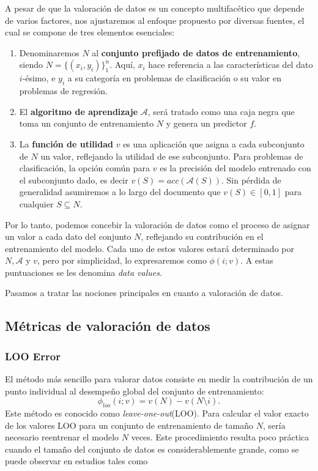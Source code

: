 A pesar de que la valoración de datos es un concepto
multifacético que depende de varios factores, nos
ajustaremos al enfoque propuesto por diversas
fuentes\cite{dataShapley,betaShapley}, el cual se compone
de tres elementos esenciales:

\begin{enumerate}
  \item  Denominaremos $N$ al \textbf{conjunto prefijado de datos
  de entrenamiento}, siendo $N = \{ (x_i, y_i) \}_1^n$.
  Aquí, $x_i$ hace referencia a las características del dato
  $i$-ésimo, e $y_i$ a su categoría en problemas de
  clasificación o su valor en problemas de regresión.
  
  \item El \textbf{algoritmo de aprendizaje}  $\mathcal{A}$,
  será tratado como una caja negra que toma un conjunto de
  entrenamiento $N$ y genera un predictor $f$.
  
  \item La \textbf{función de utilidad} $v$ es una aplicación
  que asigna a cada subconjunto de $N$ un valor, reflejando
  la utilidad de ese subconjunto. Para problemas de clasificación,
  la opción común para $v$ es la precisión del modelo
  entrenado con el subconjunto dado, es decir
  $v(S) = acc (\mathcal{A} (S))$. Sin pérdida de generalidad
  asumiremos a lo largo del documento que $v (S) \in [0, 1]$
  para cualquier $S \subseteq N$.
\end{enumerate}

Por lo tanto, podemos concebir la valoración de datos como el
proceso de asignar un valor a cada dato del conjunto $N$,
reflejando su contribución en el entrenamiento del modelo.
Cada uno de estos valores estará determinado por $N,
\mathcal{A}$ y $v$, pero por simplicidad, lo expresaremos
como $\phi(i ; v)$. A estas puntuaciones se les denomina
\textit{data values}.

Pasamos a tratar las nociones principales en cuanto a valoración
de datos.

\subsection{Métricas de valoración de datos}

\subsubsection{LOO Error}

El método más sencillo para valorar datos consiste en medir la
contribución de un punto individual al desempeño global del
conjunto de entrenamiento:
\[
  \phi_{{loo}} (i ; v) = v (N) - v (N \setminus i).
\]
Este método es conocido como \textit{leave-one-out}(LOO).
Para calcular el valor exacto de los valores LOO para
un conjunto de entrenamiento de tamaño $N$, sería
necesario reentrenar el modelo $N$ veces. Este procedimiento
resulta poco práctica cuando el tamaño del conjunto de datos
es considerablemente grande, como se puede observar en estudios
tales como \cite{looFuck}

